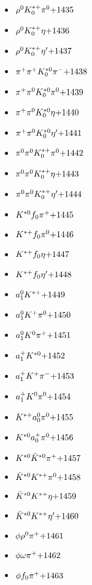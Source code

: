 \begin{multicols}{3}
\begin{itemize}
 \item $ \rho^{0} K_{0}^{*+} \pi^{0} \hfill{+1435}$
 \item $ \rho^{0} K_{0}^{*+} \eta \hfill{+1436}$
 \item $ \rho^{0} K_{0}^{*+} {\eta^{\prime}} \hfill{+1437}$
 \item $ \pi^{+} \pi^{+} K_{0}^{*0} \pi^{-} \hfill{+1438}$
 \item $ \pi^{+} \pi^{0} K_{0}^{*0} \pi^{0} \hfill{+1439}$
 \item $ \pi^{+} \pi^{0} K_{0}^{*0} \eta \hfill{+1440}$
 \item $ \pi^{+} \pi^{0} K_{0}^{*0} {\eta^{\prime}} \hfill{+1441}$
 \item $ \pi^{0} \pi^{0} K_{0}^{*+} \pi^{0} \hfill{+1442}$
 \item $ \pi^{0} \pi^{0} K_{0}^{*+} \eta \hfill{+1443}$
 \item $ \pi^{0} \pi^{0} K_{0}^{*+} {\eta^{\prime}} \hfill{+1444}$
 \item $ K^{*0} f_{0} \pi^{+} \hfill{+1445}$
 \item $ K^{*+} f_{0} \pi^{0} \hfill{+1446}$
 \item $ K^{*+} f_{0} \eta \hfill{+1447}$
 \item $ K^{*+} f_{0} {\eta^{\prime}} \hfill{+1448}$
 \item $ a_{1}^{0} K^{*+} \hfill{+1449}$
 \item $ a_{1}^{0} K^{+} \pi^{0} \hfill{+1450}$
 \item $ a_{1}^{0} K^{0} \pi^{+} \hfill{+1451}$
 \item $ a_{1}^{+} K^{*0} \hfill{+1452}$
 \item $ a_{1}^{+} K^{+} \pi^{-} \hfill{+1453}$
 \item $ a_{1}^{+} K^{0} \pi^{0} \hfill{+1454}$
 \item $ K^{*+} a_{0}^{0} \pi^{0} \hfill{+1455}$
 \item $ K^{*0} a_{0}^{+} \pi^{0} \hfill{+1456}$
 \item $ K^{*0} \bar{K}^{*0} \pi^{+} \hfill{+1457}$
 \item $ \bar{K}^{*0} K^{*+} \pi^{0} \hfill{+1458}$
 \item $ \bar{K}^{*0} K^{*+} \eta \hfill{+1459}$
 \item $ \bar{K}^{*0} K^{*+} {\eta^{\prime}} \hfill{+1460}$
 \item $ \phi \rho^{0} \pi^{+} \hfill{+1461}$
 \item $ \phi \omega \pi^{+} \hfill{+1462}$
 \item $ \phi f_{0} \pi^{+} \hfill{+1463}$

\end{itemize}
\end{multicols}
